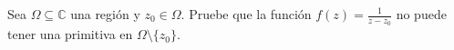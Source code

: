 \documentclass[../main.tex]{subfiles}
\begin{document}
\begin{problema}
    Sea \(\Omega \subseteq \mathbb{C}\) una región y \(z_{0}\in \Omega\). Pruebe que
    la función \( f(z) = \tfrac{1}{z - z_{0}}\) no puede tener una primitiva en
    \(\Omega\setminus \{z_{0}\}\).
\end{problema}
\end{document}
